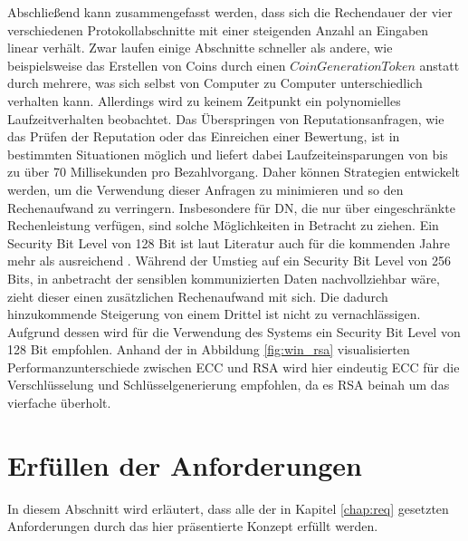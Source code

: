 \documentclass[
	fontsize=11pt,
	headings=small,
	parskip=half,           %
	bibliography=totoc,
	numbers=noenddot,       %
	open=any,               %
]{scrreprt}
\begin{document}
Abschließend kann zusammengefasst werden, dass sich die Rechendauer der vier verschiedenen Protokollabschnitte mit einer steigenden Anzahl an Eingaben linear verhält. Zwar laufen einige Abschnitte schneller als andere, wie beispielsweise das Erstellen von Coins durch einen $CoinGenerationToken$ anstatt durch mehrere, was sich selbst von Computer zu Computer unterschiedlich verhalten kann. Allerdings wird zu keinem Zeitpunkt ein polynomielles Laufzeitverhalten beobachtet. Das Überspringen von Reputationsanfragen, wie das Prüfen der Reputation oder das Einreichen einer Bewertung, ist in bestimmten Situationen möglich und liefert dabei Laufzeiteinsparungen von bis zu über 70 Millisekunden pro Bezahlvorgang. Daher können Strategien entwickelt werden, um die Verwendung dieser Anfragen zu minimieren und so den Rechenaufwand zu verringern. Insbesondere für DN, die nur über eingeschränkte Rechenleistung verfügen, sind solche Möglichkeiten in Betracht zu ziehen. Ein Security Bit Level von 128 Bit ist laut Literatur auch für die kommenden Jahre mehr als ausreichend \cite{elaine2016recommendation,bsi2020cryptographic}. Während der Umstieg auf ein Security Bit Level von 256 Bits, in anbetracht der sensiblen kommunizierten Daten nachvollziehbar wäre, zieht dieser einen zusätzlichen Rechenaufwand mit sich. Die dadurch hinzukommende Steigerung von einem Drittel ist nicht zu vernachlässigen. Aufgrund dessen wird für die Verwendung des Systems ein Security Bit Level von 128 Bit empfohlen. Anhand der in Abbildung \ref{fig:win_rsa} visualisierten Performanzunterschiede zwischen ECC und RSA wird hier eindeutig ECC für die Verschlüsselung und Schlüsselgenerierung empfohlen, da es RSA beinah um das vierfache überholt.

\section{Erfüllen der Anforderungen}
In diesem Abschnitt wird erläutert, dass alle der in Kapitel \ref{chap:req} gesetzten Anforderungen durch das hier präsentierte Konzept erfüllt werden.
\end{document}
